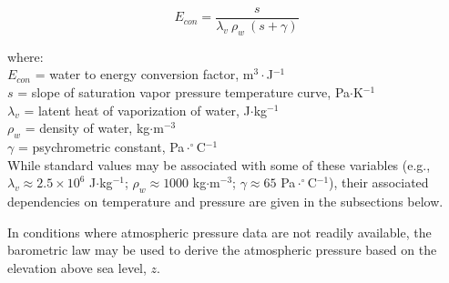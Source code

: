 \begin{equation}
\label{eq:econ}
	E_{con} = \frac{s}{\lambda_v\:\rho_w\:\left(s+\gamma\right)}
\end{equation}

\noindent where: \\
\indent $E_{con}$ = water to energy conversion factor, m$^{3}\cdot$J$^{-1}$\\
\indent $s$ = slope of saturation vapor pressure temperature curve, Pa$\cdot$K$^{-1}$ \\
\indent $\lambda_v$ = latent heat of vaporization of water, J$\cdot$kg$^{-1}$\\
\indent $\rho_w$ = density of water, kg$\cdot$m$^{-3}$\\
\indent $\gamma$ = psychrometric constant, Pa$\cdot^{\circ}$C$^{-1}$ \\

\noindent While standard values may be associated with some of these variables (e.g., $\lambda_v \approx 2.5\times 10^6$ J$\cdot$kg$^{-1}$; $\rho_w \approx 1000$ kg$\cdot$m$^{-3}$; $\gamma \approx 65$ Pa$\cdot^{\circ}$C$^{-1}$), their associated dependencies on temperature and pressure are given in the subsections below.

In conditions where atmospheric pressure data are not readily available, the barometric law may be used to derive the atmospheric pressure based on the elevation above sea level, $z$.

